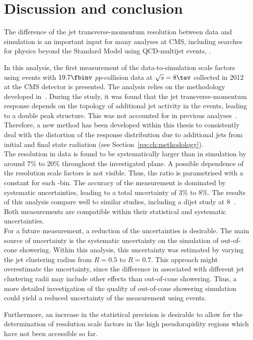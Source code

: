 \chapter{Discussion and conclusion}
\label{res:ch:Discussion}
The difference of the jet transverse-momentum resolution between data and simulation is an important input for many analyses at CMS, including searches for physics beyond the Standard Model using QCD-multijet events, \eg\cite{bib:CMS:RA2_8TeV,bib:CMS:MT2_8TeV,bib:CMS:AlphaT_8TeV}.

In this analysis, the first measurement of the data-to-simulation scale factors \rhores %
using \GAMJET events with $19.7\fbinv$ $pp$-collision data at $\sqrt{s}=8 \tev$ collected in 2012 at the CMS detector is presented.
The analysis relies on the methodology developed in~\cite{bib:CMS:JERCPaper_2011,CMS:PAS:JETResolution_7TeV}.
During the study, it was found that the jet transverse-momentum response depends on the topology of additional jet activity in the events, leading to a double peak structure.
This was not accounted for in previous analyses~\cite{bib:CMS:JERCPaper_2011,CMS:PAS:JETResolution_7TeV}.
Therefore, a new method has been developed within this thesis to consistently deal with the distortion of the response distribution due to additional jets from initial and final state radiation (see Section~\ref{res:ch:methodology}).\\

The resolution in data is found to be systematically larger than in simulation by around $7\%$ to $20\%$ throughout the investigated \etajet plane. 
A possible \ptjet dependence of the resolution scale factors \rhores is not visible. 
Thus, the ratio is parametrised with a constant for each \etajet-bin.
The accuracy of the measurement is dominated by systematic uncertainties, leading to a total uncertainty of 3\% to 8\%.
The results of this analysis compare well to similar studies, including a dijet study at 8\tev ~\cite{bib:Kristin_Thesis}.
Both measurements are compatible within their statistical and systematic uncertainties.\\

For a future measurement, a reduction of the uncertainties is desirable.
The main source of uncertainty is the systematic uncertainty on the simulation of out-of-cone showering.
Within this analysis, this uncertainty was estimated by varying the jet clustering radius from $R=0.5$ to $R=0.7$.
This approach might overestimate the uncertainty, since the difference in \rhores associated with different jet clustering radii may include other effects than out-of-cone showering.
Thus, a more detailed investigation of the quality of out-of-cone showering simulation could yield a reduced uncertainty of the \rhores measurement using \GAMJET events.

Furthermore, an increase in the statistical precision is desirable to allow for the determination of resolution scale factors in the high pseudorapidity regions which have not been accessible so far.

